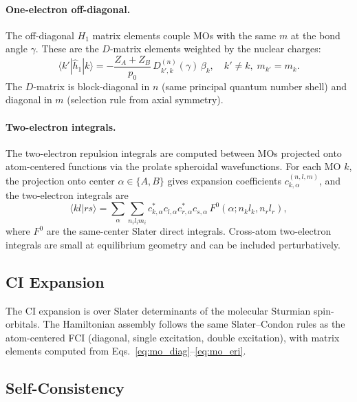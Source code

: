 \documentclass[aps,pra,twocolumn,superscriptaddress,longbibliography]{revtex4-2}
\begin{document}
\paragraph{One-electron off-diagonal.}
The off-diagonal $H_1$ matrix elements couple MOs with the same $m$
at the bond angle $\gamma$.  These are the $D$-matrix elements
weighted by the nuclear charges:
\begin{equation}
\langle k' | \hat{h}_1 | k \rangle
= -\frac{Z_A + Z_B}{p_0}\, D^{(n)}_{k',k}(\gamma)\,\beta_k,
\quad k' \neq k,\; m_{k'} = m_k.
\label{eq:mo_offdiag}
\end{equation}
The $D$-matrix is block-diagonal in $n$ (same principal quantum number
shell) and diagonal in $m$ (selection rule from axial symmetry).

\paragraph{Two-electron integrals.}
The two-electron repulsion integrals are computed between MOs projected
onto atom-centered functions via the prolate spheroidal wavefunctions.
For each MO $k$, the projection onto center $\alpha \in \{A, B\}$
gives expansion coefficients $c_{k,\alpha}^{(n,l,m)}$, and the
two-electron integrals are
\begin{equation}
\langle kl | rs \rangle = \sum_{\alpha} \sum_{n_i l_i m_i}
c_{k,\alpha}^* c_{l,\alpha} c_{r,\alpha}^* c_{s,\alpha}\,
F^0(\alpha; n_k l_k, n_r l_r),
\label{eq:mo_eri}
\end{equation}
where $F^0$ are the same-center Slater direct integrals.  Cross-atom
two-electron integrals are small at equilibrium geometry and can be
included perturbatively.

\subsection{CI Expansion}

The CI expansion is over Slater determinants of the molecular Sturmian
spin-orbitals.  The Hamiltonian assembly follows the same Slater--Condon
rules as the atom-centered FCI (diagonal, single excitation, double
excitation), with matrix elements computed from
Eqs.~\eqref{eq:mo_diag}--\eqref{eq:mo_eri}.

\subsection{Self-Consistency}
\end{document}
